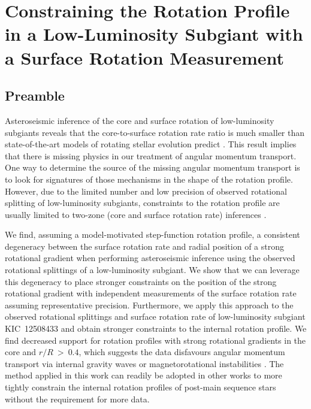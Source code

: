 
\newcommand\thestar{KIC~12508433}

\newcommand{\Revision}[1]{#1}
\newcommand{\TW}[1]{#1}

\newcommand{\Add}[1]{#1}

\chapter{Constraining the Rotation Profile in a Low-Luminosity Subgiant with a Surface Rotation Measurement}

\section*{Preamble}

Asteroseismic inference of the core and surface rotation of low-luminosity subgiants reveals that the core-to-surface rotation rate ratio is much smaller than state-of-the-art models of rotating stellar evolution predict \citep{deheuvels_seismic_2014, cantiello_angular_2014, eggenberger_asteroseismology_2019}.
This result implies that there is missing physics in our treatment of angular momentum transport.
One way to determine the source of the missing angular momentum transport is to look for signatures of those mechanisms in the shape of the rotation profile.
However, due to the limited number and low precision of observed rotational splitting of low-luminosity subgiants, constraints to the rotation profile are usually limited to two-zone (core and surface rotation rate) inferences \citep{deheuvels_seismic_2014}.

We find, assuming a model-motivated step-function rotation profile, a consistent degeneracy between the surface rotation rate and radial position of a strong rotational gradient when performing asteroseismic inference using the observed rotational splittings of a low-luminosity subgiant.
We show that we can leverage this degeneracy to place stronger constraints on the position of the strong rotational gradient with independent measurements of the surface rotation rate assuming representative precision.
Furthermore, we apply this approach to the observed rotational splittings and surface rotation rate of low-luminosity subgiant KIC~12508433 and obtain stronger constraints to the internal rotation profile.
We find decreased support for rotation profiles with strong rotational gradients in the core and $r/R\ > \ 0.4$, which suggests the data disfavours angular momentum transport via internal gravity waves \citep[e.g.,][]{pincon_can_2017} or magnetorotational instabilities \citep[e.g.,][]{spada_angular_2016,menou_magnetorotational_2006}.
The method applied in this work can readily be adopted in other works to more tightly constrain the internal rotation profiles of post-main sequence stars without the requirement for more data.

